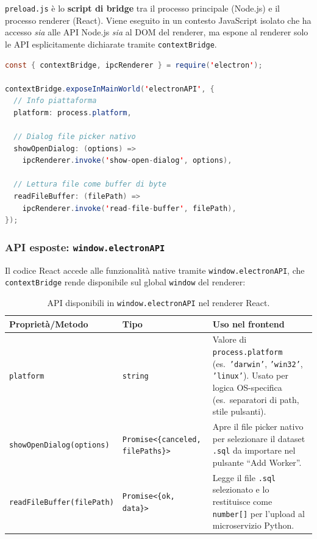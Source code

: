 \documentclass[a4paper,12pt]{article}
\begin{document}
\texttt{preload.js} \`{e} lo \textbf{script di bridge} tra il processo
principale (Node.js) e il processo renderer (React). Viene eseguito
in un contesto JavaScript isolato che ha accesso \textit{sia} alle
API Node.js \textit{sia} al DOM del renderer, ma espone al renderer
solo le API esplicitamente dichiarate tramite \texttt{contextBridge}.

\begin{lstlisting}[language=Java, caption={\texttt{preload.js} --- esposizione sicura delle API native.}]
const { contextBridge, ipcRenderer } = require('electron');

contextBridge.exposeInMainWorld('electronAPI', {
  // Info piattaforma
  platform: process.platform,

  // Dialog file picker nativo
  showOpenDialog: (options) =>
    ipcRenderer.invoke('show-open-dialog', options),

  // Lettura file come buffer di byte
  readFileBuffer: (filePath) =>
    ipcRenderer.invoke('read-file-buffer', filePath),
});
\end{lstlisting}

\noindent \subsubsection{API esposte: \texttt{window.electronAPI}}

Il codice React accede alle funzionalit\`{a} native tramite
\texttt{window.electronAPI}, che \texttt{contextBridge} rende
disponibile sul global \texttt{window} del renderer:

\begin{table}[H]
\centering\small
\caption{API disponibili in \texttt{window.electronAPI} nel renderer React.}
\begin{tabular}{L{4.2cm} L{3.8cm} L{4.5cm}}
\toprule
\textbf{Propriet\`{a}/Metodo} & \textbf{Tipo} & \textbf{Uso nel frontend} \\
\midrule
\texttt{platform} &
  \texttt{string} &
  Valore di \texttt{process.platform} (es.\ \texttt{'darwin'},
  \texttt{'win32'}, \texttt{'linux'}). Usato per logica OS-specifica
  (es.\ separatori di path, stile pulsanti). \\[3pt]
{\small\texttt{showOpenDialog(\allowbreak{}options)}} &
  {\small\texttt{Promise<\{canceled,\allowbreak{} filePaths\}>}} &
  Apre il file picker nativo per selezionare il dataset \texttt{.sql}
  da importare nel pulsante ``Add Worker''. \\[3pt]
\texttt{readFileBuffer(\allowbreak{}filePath)} &
  \texttt{Promise<\{ok, data\}>} &
  Legge il file \texttt{.sql} selezionato e lo restituisce come
  \texttt{number[]} per l'upload al microservizio Python. \\
\bottomrule
\end{tabular}
\end{table}
\end{document}
